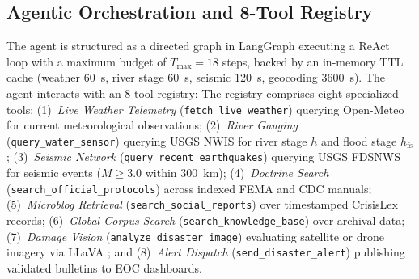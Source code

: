 \documentclass[conference]{IEEEtran}
\begin{document}
\subsection{Agentic Orchestration and 8-Tool Registry}
The agent is structured as a directed graph in LangGraph \cite{langgraph} executing a ReAct loop \cite{react} with a maximum budget of $T_{\max} = 18$ steps, backed by an in-memory TTL cache (weather 60~s, river stage 60~s, seismic 120~s, geocoding 3600~s). The agent interacts with an 8-tool registry:
The registry comprises eight specialized tools: (1)~\textit{Live Weather Telemetry} (\texttt{fetch\_live\_weather}) querying Open-Meteo for current meteorological observations; (2)~\textit{River Gauging} (\texttt{query\_water\_sensor}) querying USGS NWIS for river stage $h$ and flood stage $h_{\mathrm{fs}}$; (3)~\textit{Seismic Network} (\texttt{query\_recent\_earthquakes}) querying USGS FDSNWS for seismic events ($M \ge 3.0$ within 300~km); (4)~\textit{Doctrine Search} (\texttt{search\_official\_protocols}) across indexed FEMA and CDC manuals; (5)~\textit{Microblog Retrieval} (\texttt{search\_social\_reports}) over timestamped CrisisLex records; (6)~\textit{Global Corpus Search} (\texttt{search\_knowledge\_base}) over archival data; (7)~\textit{Damage Vision} (\texttt{analyze\_disaster\_image}) evaluating satellite or drone imagery via LLaVA \cite{llava}; and (8)~\textit{Alert Dispatch} (\texttt{send\_disaster\_alert}) publishing validated bulletins to EOC dashboards.
\end{document}
